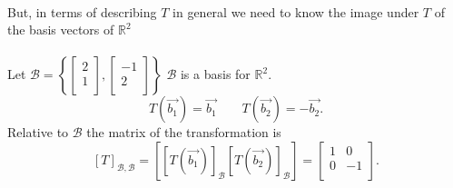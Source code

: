 \documentclass{report}
\begin{document}
{

 \\

            But, in terms of describing $ T$ in general we need to know the image under $ T$ of the basis vectors of $ \mathbb{R} ^2$ \\
            \\
            Let $ \mathcal{B} = \left\{  \begin{bmatrix}
            2\\
            1\\
            \end{bmatrix}
            , \begin{bmatrix}
            -1\\
           2\\
            \end{bmatrix}  \right\} $  $ \mathcal{B} $ is a basis for $ \mathbb{R} ^2$.\\
            \[
            T \left(  \vec{ b_1}  \right) = \vec{ b_1}  \qquad  T \left(  \vec{ b_2}  \right) = - \vec{ b_2}
            .\] 
            Relative to $ \mathcal{B}$ the matrix of the transformation is
            \[
            \left[ T \right] _{ \mathcal{B} , \mathcal{B}} = \left[ \left[ T \left(  \vec{ b_1}  \right)  \right] _{ \mathcal{B}} \left[ T \left(  \vec{ b_2}  \right)  \right] _{ \mathcal{B}}  \right] = \begin{bmatrix}
            1 & 0\\
            0 & -1\\
            \end{bmatrix}
            .\] 
    
}
\end{document}
